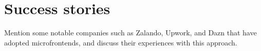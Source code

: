 \section{Success stories}
Mention some notable companies such as Zalando, Upwork, and Dazn that have adopted microfrontends, and discuss their experiences with this approach.